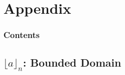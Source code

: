 \documentclass[english, aspectratio=169]{beamer}
\begin{document}


\blankframe

\section{Appendix}

\begin{frame}{}
  \frametitle{Contents}
  \tableofcontents[currentsection]
\end{frame}

\subsection{$\lfloor a \rfloor_n$: Bounded Domain}
\end{document}
